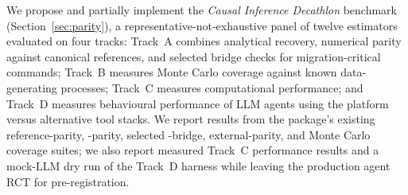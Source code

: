 


\item We propose and partially implement the \emph{Causal Inference
Decathlon} benchmark
(Section~\ref{sec:parity}), a representative-not-exhaustive panel of
twelve estimators evaluated on four tracks: Track~A combines
analytical recovery, numerical parity against canonical
 references, and selected  bridge checks
for migration-critical commands; Track~B measures Monte Carlo
coverage against known data-generating processes; Track~C measures
computational performance; and Track~D measures behavioural
performance of LLM agents using the platform versus alternative tool
stacks. We report results from the
package's existing reference-parity, -parity,
selected -bridge, external-parity, and Monte Carlo
coverage suites; we also report measured Track~C performance results
and a mock-LLM dry run of the Track~D harness while leaving the
production agent RCT for pre-registration.





